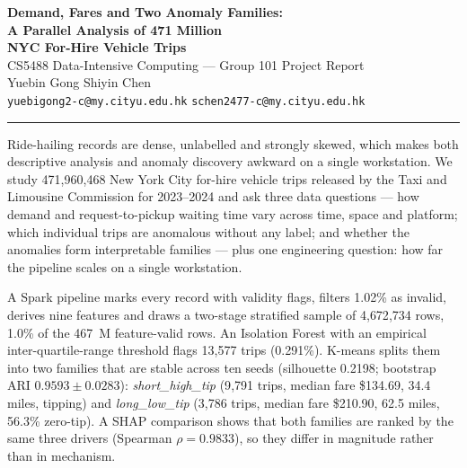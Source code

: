 \documentclass[11pt,a4paper]{article}
\newcommand{\code}[1]{\texttt{\small #1}}
\begin{document}
\begin{center}
{\LARGE\bfseries Demand, Fares and Two Anomaly Families:\\[0.15em]
A Parallel Analysis of 471 Million\\[0.05em]
NYC For-Hire Vehicle Trips}\\[1.1em]
{\large CS5488 Data-Intensive Computing --- Group 101 Project Report}\\[0.9em]
Yuebin Gong \quad Shiyin Chen\\
\code{yuebigong2-c@my.cityu.edu.hk} \quad \code{schen2477-c@my.cityu.edu.hk}\\[0.5em]
\date{}
\end{center}

\vspace{0.3em}

\par
\vspace{-0.3em}
\noindent\rule{\textwidth}{0.4pt}\par
\begingroup\small

Ride-hailing records are dense, unlabelled and strongly skewed, which makes both descriptive analysis and anomaly discovery awkward on a single workstation. We study 471{,}960{,}468 New York City for-hire vehicle trips released by the Taxi and Limousine Commission for 2023--2024 and ask three data questions --- how demand and request-to-pickup waiting time vary across time, space and platform; which individual trips are anomalous without any label; and whether the anomalies form interpretable families --- plus one engineering question: how far the pipeline scales on a single workstation.

A Spark pipeline marks every record with validity flags, filters 1.02\% as invalid, derives nine features and draws a two-stage stratified sample of 4{,}672{,}734 rows, 1.0\% of the 467~M feature-valid rows. An Isolation Forest with an empirical inter-quartile-range threshold flags 13{,}577 trips (0.291\%). K-means splits them into two families that are stable across ten seeds (silhouette 0.2198; bootstrap ARI $0.9593 \pm 0.0283$): \emph{short\_high\_tip} (9{,}791 trips, median fare \$134.69, 34.4 miles, tipping) and \emph{long\_low\_tip} (3{,}786 trips, median fare \$210.90, 62.5 miles, 56.3\% zero-tip). A SHAP comparison shows that both families are ranked by the same three drivers (Spearman $\rho = 0.9833$), so they differ in magnitude rather than in mechanism.
\end{document}
